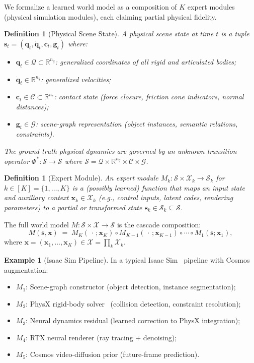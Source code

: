\documentclass[11pt,twocolumn]{article}
\newtheorem{definition}[theorem]{Definition}
\theoremstyle{definition}
\newtheorem{example}[theorem]{Example}
\newcommand{\R}{\mathbb{R}}
\newcommand{\cS}{\mathcal{S}}
\newcommand{\cX}{\mathcal{X}}
\newcommand{\cG}{\mathcal{G}}
\newcommand{\cC}{\mathcal{C}}
\newcommand{\cQ}{\mathcal{Q}}
\begin{document}
We formalize a learned world model as a composition of
$K$ expert modules (physical simulation modules), each
claiming partial physical fidelity.

\begin{definition}[Physical Scene State]
\label{def:state}
A \emph{physical scene state} at time $t$ is a tuple
$\mathbf{s}_t = (\mathbf{q}_t, \dot{\mathbf{q}}_t, \mathbf{c}_t, \mathbf{g}_t)$
where:
\begin{itemize}[nosep]
  \item $\mathbf{q}_t \in \cQ \subset \R^{n_q}$: generalized coordinates of
    all rigid and articulated bodies;
  \item $\dot{\mathbf{q}}_t \in \R^{n_q}$: generalized velocities;
  \item $\mathbf{c}_t \in \cC \subset \R^{n_c}$: contact state (force closure,
    friction cone indicators, normal distances);
  \item $\mathbf{g}_t \in \cG$: scene-graph representation (object instances,
    semantic relations, constraints).
\end{itemize}
The \emph{ground-truth physical dynamics} are governed by an unknown
transition operator $\Phi^*: \cS \to \cS$ where $\cS = \cQ \times \R^{n_q}
\times \cC \times \cG$.
\end{definition}

\begin{definition}[Expert Module]
\label{def:expert}
An \emph{expert module} $M_k: \cS \times \cX_k \to \cS_k$ for $k \in [K] =
\{1,\dots,K\}$ is a (possibly learned) function that maps an input state and
auxiliary context $\mathbf{x}_k \in \cX_k$ (e.g., control inputs, latent
codes, rendering parameters) to a partial or transformed state
$\mathbf{s}_k \in \cS_k \subseteq \cS$.
\end{definition}

The full world model $M: \cS \times \cX \to \cS$ is the cascade composition:
\begin{equation}\label{eq:composition}
  M(\mathbf{s}, \mathbf{x}) \;=\;
  M_K(\,\cdot\,; \mathbf{x}_K) \circ M_{K-1}(\,\cdot\,; \mathbf{x}_{K-1})
  \circ \cdots \circ M_1(\mathbf{s}; \mathbf{x}_1),
\end{equation}
where $\mathbf{x} = (\mathbf{x}_1,\dots,\mathbf{x}_K) \in \cX = \prod_k \cX_k$.

\begin{example}[Isaac Sim Pipeline]
In a typical Isaac Sim~\cite{isaacsim2023} pipeline with Cosmos~\cite{cosmos2025}
augmentation:
\begin{itemize}[nosep]
  \item $M_1$: Scene-graph constructor (object detection, instance segmentation);
  \item $M_2$: PhysX rigid-body solver~\cite{physx} (collision detection, constraint resolution);
  \item $M_3$: Neural dynamics residual (learned correction to PhysX integration);
  \item $M_4$: RTX neural renderer (ray tracing + denoising);
  \item $M_5$: Cosmos video-diffusion prior (future-frame prediction).
\end{itemize}
\end{example}
\end{document}
